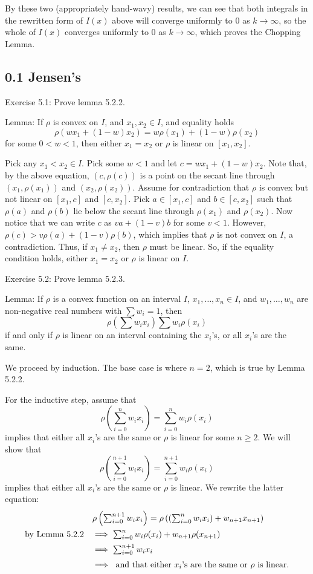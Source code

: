 \documentclass[11pt]{article}
\begin{document}
By these two (appropriately hand-wavy) results, we can see that both integrals
in the rewritten form of $I(x)$ above will converge uniformly to 0
as $k\to\infty$, so the whole of $I(x)$ converges uniformly to 0 as
$k\to\infty$, which proves the Chopping Lemma.

\subsection*{0.1 Jensen's}

Exercise 5.1: Prove lemma 5.2.2.

Lemma: If $\rho$ is convex on $I$, and $x_1,x_2\in I$, and equality holds
\[
    \rho(wx_1+(1-w)x_2) = w\rho(x_1)+(1-w)\rho(x_2)
\]
for some $0<w<1$, then either $x_1=x_2$ or $\rho$ is linear on $[x_1,x_2]$.

Pick any $x_1<x_2\in I$.
Pick some $w<1$ and let $c=wx_1+(1-w)x_2$. Note that, by the above equation,
$(c,\rho(c))$ is a point on the secant line through
$(x_1,\rho(x_1))$ and $(x_2,\rho(x_2))$.
Assume for contradiction that $\rho$ is convex
but not linear on $[x_1,c]$ and $[c,x_2]$. Pick
$a\in[x_1,c]$ and $b\in[c,x_2]$ such that $\rho(a)$ and $\rho(b)$ lie
below the secant line through $\rho(x_1)$ and $\rho(x_2)$. 
Now notice that we can write $c$ as $va+(1-v)b$ for some
$v<1$. However, $\rho(c)>v\rho(a)+(1-v)\rho(b)$, which implies
that $\rho$ is not convex on $I$, a contradiction. Thus, if $x_1\neq x_2$,
then $\rho$ must be linear. So, if the equality condition holds,
either $x_1=x_2$ or $\rho$ is linear on $I$. 

Exercise 5.2: Prove lemma 5.2.3.

Lemma: If $\rho$ is a convex function on an interval $I$,
$x_1,\ldots,x_n\in I$,
and $w_1,\ldots,w_n$ are non-negative real numbers with $\sum w_i=1$, then
\[
    \rho\left(\sum w_ix_i\right)\sum w_i\rho(x_i)
\]
if and only if $\rho$ is linear on an interval containing the
$x_i$'s, or all $x_i$'s are the same.

We proceed by induction. The base case is where $n=2$, which is true by
Lemma 5.2.2.

For the inductive step, assume that 
\[
    \rho\left(\sum_{i=0}^n w_ix_i\right)=\sum_{i=0}^n w_i\rho(x_i)
\]
implies that either all $x_i$'s are the same or $\rho$ is linear 
for some $n\geq2$. We will show that
\[
    \rho\left(\sum_{i=0}^{n+1} w_ix_i\right)=\sum_{i=0}^{n+1} w_i\rho(x_i)
\]
implies that either all $x_i$'s are the same or $\rho$ is linear.
We rewrite the latter equation:
\[
\def\arraystretch{1.5}
\begin{array}{rl}
& \rho\left(\sum_{i=0}^{n+1}w_ix_i\right) =
    \rho\left(\left(\sum_{i=0}^nw_ix_i\right)+w_{n+1}x_{n+1}\right) \\
\textrm{by Lemma 5.2.2}&\implies \sum_{i=0}^nw_i\rho(x_i)+w_{n+1}\rho(x_{n+1}) \\
&\implies \sum_{i=0}^{n+1}w_ix_i \\
&\implies \textrm{ and that either $x_i$'s are the same or $\rho$ is linear.}
\end{array}
\]
\end{document}
